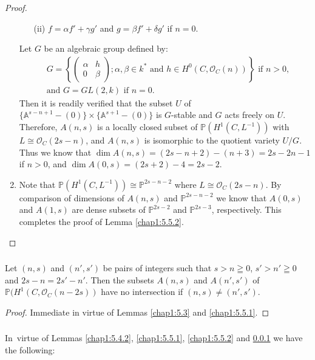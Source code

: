 \begin{proof}
\begin{enumerate}
\begin{itemize}
\item[(ii)] $f=\alpha f'+\gamma g'$ and $g=\beta f'+\delta g'$ if
  $n=0$.
\end{itemize}
Let $G$ be an algebraic group defined by:
\begin{align*}
& G=\left\{
\begin{pmatrix}
\alpha & h\\
0 & \beta
\end{pmatrix}
; \alpha,\beta\in k^{\ast}\text{ \  and \ } h\in
H^{0}(C,\mathscr{O}_{C}(n))\right\}\text{ \ if \ } n>0,\\
&\text{and \ } G=GL(2,k)\text{ \  if \ } n=0.
\end{align*}
Then it is readily verified that the subset $U$ of
$\{\mathbb{A}^{s-n+1}-(0)\}\times \{\mathbb{A}^{s+1}-(0)\}$ is
$G$-stable and $G$ acts freely on $U$. Therefore, $A(n,s)$ is a
locally closed subset of $\mathbb{P}(H^{1}(C,L^{-1}))$ with $L\cong
\mathscr{O}_{C}(2s-n)$, and $A(n,s)$ is isomorphic to the quotient
variety $U/G$. Thus we know that $\dim A(n,s)=(2s-n+2)-(n+3)=2s-2n-1$
if $n>0$, and $\dim A(0,s)=(2s+2)-4=2s-2$.

\item Note that $\mathbb{P}(H^{1}(C,L^{-1}))\cong \mathbb{P}^{2s-n-2}$
  where $L\cong \mathscr{O}_{C}(2s-n)$. By comparison of dimensions of
  $A(n,s)$ and $\mathbb{P}^{2s-n-2}$ we know that $A(0,s)$ and
  $A(1,s)$ are dense subsets of $\mathbb{P}^{2s-2}$ and
  $\mathbb{P}^{2s-3}$, respectively. This completes the proof of Lemma
  \ref{chap1:5.5.2}. 
\end{enumerate}
\end{proof}

\subsubsection{}\label{chap1:5.5.3}
\begin{lemma*}
  Let $(n,s)$ and $(n',s')$ be pairs of integers such that $s>n\geqq 0$,
  $s'>n'\geqq 0$ and $2s-n=2s'-n'$. Then the subsets $A(n,s)$ and
  $A(n',s')$ of $\mathbb{P}(H^{1}(C,\mathscr{O}_{C}(n-2s))$ have no
  intersection if $(n,s)\neq (n',s')$.
\end{lemma*}

\begin{proof}
  Immediate in virtue of Lemmas \ref{chap1:5.3} and \ref{chap1:5.5.1}.
\end{proof}

\subsubsection{}\label{chap1:5.5.4}
In\pageoriginale\ virtue of Lemmas \ref{chap1:5.4.2}, \ref{chap1:5.5.1},
\ref{chap1:5.5.2} and \ref{chap1:5.5.3} we have the following:

